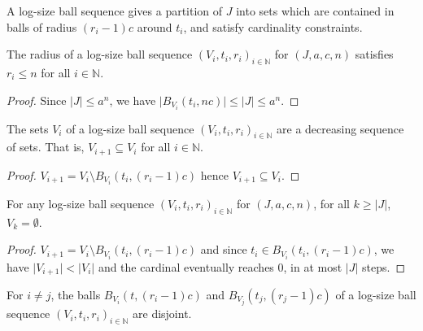 A log-size ball sequence gives a partition of $J$ into sets which are contained in balls of radius $(r_i - 1)c$ around $t_i$, and satisfy cardinality constraints.


\begin{lemma}\label{lem:logSizeRadius_logSizeBallSequence_le}
  \leanok
The radius of a log-size ball sequence $(V_i, t_i, r_i)_{i \in \mathbb{N}}$ for $(J, a, c, n)$ satisfies $r_i \le n$ for all $i \in \mathbb{N}$.
\end{lemma}

\begin{proof}
\leanok
Since $|J| \le a^n$, we have $\vert B_{V_i}(t_i, n c) \vert \le \vert J \vert \le a^{n}$.
\end{proof}


\begin{lemma}\label{lem:logSizeBallSequence_V_anti}
  \leanok
The sets $V_i$ of a log-size ball sequence $(V_i, t_i, r_i)_{i \in \mathbb{N}}$ are a decreasing sequence of sets. That is, $V_{i+1} \subseteq V_i$ for all $i \in \mathbb{N}$.
\end{lemma}

\begin{proof}
\leanok
$V_{i+1} = V_i \setminus B_{V_i}(t_i, (r_i - 1)c)$ hence $V_{i+1} \subseteq V_i$.
\end{proof}


\begin{lemma}\label{lem:logSizeBallSequence_eq_zero}
  \leanok
For any log-size ball sequence $(V_i, t_i, r_i)_{i \in \mathbb{N}}$ for $(J, a, c, n)$, for all $k \ge \vert J \vert$, $V_k = \emptyset$.
\end{lemma}

\begin{proof}
  \leanok
$V_{i+1} = V_i \setminus B_{V_i}(t_i, (r_i - 1)c)$ and since $t_i \in B_{V_i}(t_i, (r_i - 1)c)$, we have $\vert V_{i+1} \vert < \vert V_i \vert$ and the cardinal eventually reaches $0$, in at most $\vert J \vert$ steps.
\end{proof}


\begin{lemma}\label{lem:logSizeBallSequence_disjoint_B}
  \leanok
For $i \ne j$, the balls $B_{V_i}(t, (r_i-1)c)$ and $B_{V_j}(t_j, (r_j-1)c)$ of a log-size ball sequence $(V_i, t_i, r_i)_{i \in \mathbb{N}}$ are disjoint.
\end{lemma}

